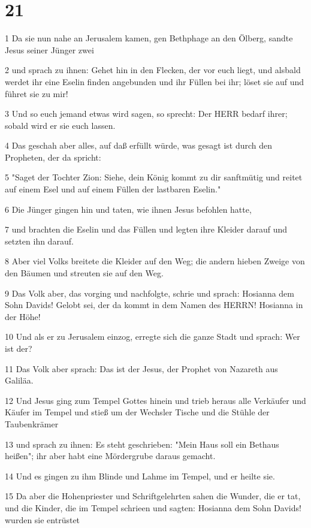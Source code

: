 \chapter{21}

\par 1 Da sie nun nahe an Jerusalem kamen, gen Bethphage an den Ölberg, sandte Jesus seiner Jünger zwei
\par 2 und sprach zu ihnen: Gehet hin in den Flecken, der vor euch liegt, und alsbald werdet ihr eine Eselin finden angebunden und ihr Füllen bei ihr; löset sie auf und führet sie zu mir!
\par 3 Und so euch jemand etwas wird sagen, so sprecht: Der HERR bedarf ihrer; sobald wird er sie euch lassen.
\par 4 Das geschah aber alles, auf daß erfüllt würde, was gesagt ist durch den Propheten, der da spricht:
\par 5 "Saget der Tochter Zion: Siehe, dein König kommt zu dir sanftmütig und reitet auf einem Esel und auf einem Füllen der lastbaren Eselin."
\par 6 Die Jünger gingen hin und taten, wie ihnen Jesus befohlen hatte,
\par 7 und brachten die Eselin und das Füllen und legten ihre Kleider darauf und setzten ihn darauf.
\par 8 Aber viel Volks breitete die Kleider auf den Weg; die andern hieben Zweige von den Bäumen und streuten sie auf den Weg.
\par 9 Das Volk aber, das vorging und nachfolgte, schrie und sprach: Hosianna dem Sohn Davids! Gelobt sei, der da kommt in dem Namen des HERRN! Hosianna in der Höhe!
\par 10 Und als er zu Jerusalem einzog, erregte sich die ganze Stadt und sprach: Wer ist der?
\par 11 Das Volk aber sprach: Das ist der Jesus, der Prophet von Nazareth aus Galiläa.
\par 12 Und Jesus ging zum Tempel Gottes hinein und trieb heraus alle Verkäufer und Käufer im Tempel und stieß um der Wechsler Tische und die Stühle der Taubenkrämer
\par 13 und sprach zu ihnen: Es steht geschrieben: "Mein Haus soll ein Bethaus heißen"; ihr aber habt eine Mördergrube daraus gemacht.
\par 14 Und es gingen zu ihm Blinde und Lahme im Tempel, und er heilte sie.
\par 15 Da aber die Hohenpriester und Schriftgelehrten sahen die Wunder, die er tat, und die Kinder, die im Tempel schrieen und sagten: Hosianna dem Sohn Davids! wurden sie entrüstet
